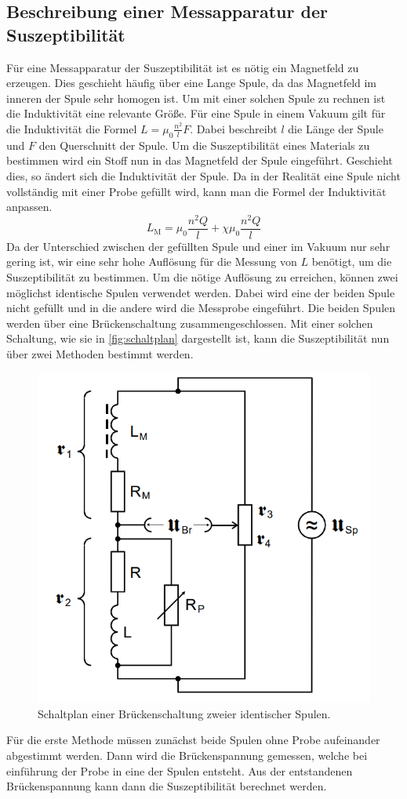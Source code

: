 \subsection{Beschreibung einer Messapparatur der Suszeptibilität}
\label{subsec:Messapparatur}
Für eine Messapparatur der Suszeptibilität ist es nötig ein Magnetfeld zu erzeugen. Dies geschieht häufig über eine Lange Spule, da das Magnetfeld im inneren der Spule sehr 
homogen ist. Um mit einer solchen Spule zu rechnen ist die Induktivität eine relevante Größe.
Für eine Spule in einem Vakuum gilt für die Induktivität die Formel $L = \mu_0 \frac{n^2}{l}F$. Dabei beschreibt $l$ die Länge der Spule und $F$ den Querschnitt der Spule.
Um die Suszeptibilität eines Materials zu bestimmen wird ein Stoff nun in das Magnetfeld der Spule eingeführt. Geschieht dies, so ändert sich die Induktivität der Spule. 
Da in der Realität eine Spule nicht vollständig mit einer Probe gefüllt wird, kann man die Formel der Induktivität anpassen.
\begin{equation}
    \label{eqn:L_M}
    L_{\text{M}} = \mu_0 \frac{n^2 Q}{l} + \chi \mu_0 \frac{n^2 Q}{l}
\end{equation} 
Da der Unterschied zwischen der gefüllten Spule und einer im Vakuum nur sehr gering ist, wir eine sehr hohe Auflösung für die Messung von $L$ benötigt,
um die Suszeptibilität zu bestimmen. Um die nötige Auflösung zu erreichen, können zwei möglichst identische Spulen verwendet werden. Dabei wird eine der beiden Spule nicht 
gefüllt und in die andere wird die Messprobe eingeführt. Die beiden Spulen werden über eine Brückenschaltung zusammengeschlossen. Mit einer solchen Schaltung, wie sie in
\autoref{fig:schaltplan} dargestellt ist, kann die Suszeptibilität nun über zwei Methoden bestimmt werden.
\begin{figure}
    \centering
    \includegraphics[width = .7\textwidth]{content/Schaltung1.PNG}
    \caption{Schaltplan einer Brückenschaltung zweier identischer Spulen. \cite{v606}}
    \label{fig:schaltplan}
\end{figure} 
Für die erste Methode müssen zunächst beide Spulen ohne Probe aufeinander abgestimmt werden. Dann wird die Brückenspannung gemessen, welche bei einführung der Probe in eine der 
Spulen entsteht. Aus der entstandenen Brückenspannung kann dann die Suszeptibilität berechnet werden.

